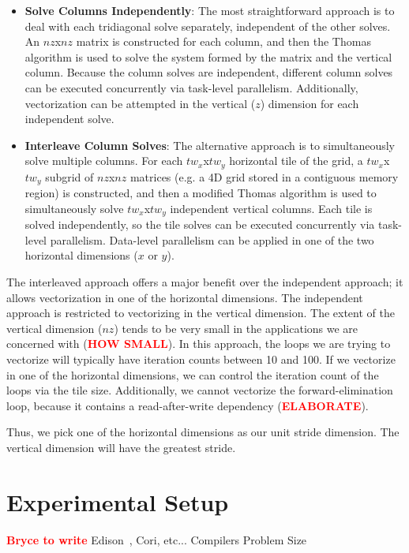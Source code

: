 \documentclass[conference]{IEEEtran}
\newcommand{\fix}[1]{{\bf \textcolor {red}{#1}}}
\begin{document}
\begin{itemize}
\item \textbf{Solve Columns Independently}: The most straightforward approach is to deal with each tridiagonal solve separately, independent of the other solves. An \(nz\)x\(nz\) matrix is constructed for each column, and then the Thomas algorithm is used to solve the system formed by the matrix and the vertical column. Because the column solves are independent, different column solves can be executed concurrently via task-level parallelism. Additionally, vectorization can be attempted in the vertical (\(z\)) dimension for each independent solve. 
\item \textbf{Interleave Column Solves}: The alternative approach is to simultaneously solve multiple columns. For each \(tw_x\)x\(tw_y\) horizontal tile of the grid, a \(tw_x\)x\(tw_y\) subgrid of \(nz\)x\(nz\) matrices (e.g. a 4D grid stored in a contiguous memory region) is constructed, and then a modified Thomas algorithm is used to simultaneously solve \(tw_x\)x\(tw_y\) independent vertical columns. Each tile is solved independently, so the tile solves can be executed concurrently via task-level parallelism. Data-level parallelism can be applied in one of the two horizontal dimensions (\(x\) or \(y\)).
\end{itemize}

The interleaved approach offers a major benefit over the independent approach;
it allows vectorization in one of the horizontal dimensions. The independent
approach is restricted to vectorizing in the vertical dimension. The extent of
the vertical dimension (\(nz\)) tends to be very small in the applications we are
concerned with (\fix{HOW SMALL}). In this approach, the loops we are trying to
vectorize will typically have iteration counts between 10 and 100. If we
vectorize in one of the horizontal dimensions, we can control the iteration
count of the loops via the tile size. Additionally, we cannot vectorize the
forward-elimination loop, because it contains a read-after-write dependency
(\fix{ELABORATE}).

Thus, we pick one of the horizontal dimensions as our unit stride dimension.
The vertical dimension will have the greatest stride. 

\section{Experimental Setup}
\fix{Bryce to write}
Edison~\cite{Edison_website}, Cori, etc...
Compilers
Problem Size
\end{document}
